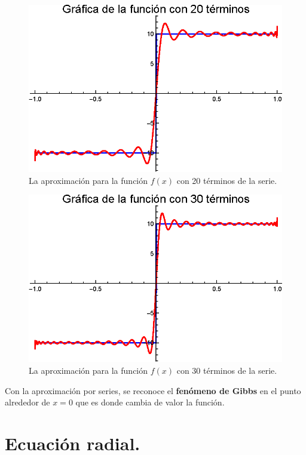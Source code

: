 \documentclass[12pt]{article}
\numberwithin{equation}{section}
\begin{document}
\begin{figure}[H]
    \centering
    \includegraphics[scale=1]{Imagenes/Expansion_Legendre_V_20.eps}
    \caption{La aproximación para la función $f (x)$ con 20 términos de la serie.}
    \label{fig:figura_plot_02}
\end{figure}
\begin{figure}[H]
    \centering
    \includegraphics[scale=1]{Imagenes/Expansion_Legendre_V_30.eps}
    \caption{La aproximación para la función $f (x)$ con 30 términos de la serie.}
    \label{fig:figura_plot_03}
\end{figure}
Con la aproximación por series, se reconoce el \textbf{fenómeno de Gibbs} en el punto alrededor de $x = 0$ que es donde cambia de valor la función.

\section{Ecuación radial.}
\end{document}
